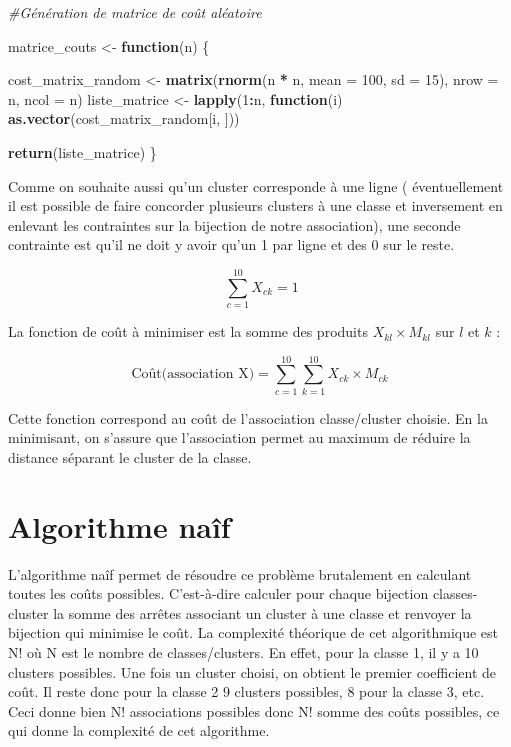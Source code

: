 \documentclass[
]{article}
\newenvironment{Shaded}{\begin{snugshade}}{\end{snugshade}}
\newcommand{\AttributeTok}[1]{\textcolor[rgb]{0.13,0.29,0.53}{#1}}
\newcommand{\CommentTok}[1]{\textcolor[rgb]{0.56,0.35,0.01}{\textit{#1}}}
\newcommand{\ControlFlowTok}[1]{\textcolor[rgb]{0.13,0.29,0.53}{\textbf{#1}}}
\newcommand{\DecValTok}[1]{\textcolor[rgb]{0.00,0.00,0.81}{#1}}
\newcommand{\FunctionTok}[1]{\textcolor[rgb]{0.13,0.29,0.53}{\textbf{#1}}}
\newcommand{\NormalTok}[1]{#1}
\newcommand{\OtherTok}[1]{\textcolor[rgb]{0.56,0.35,0.01}{#1}}
\newcommand{\SpecialCharTok}[1]{\textcolor[rgb]{0.81,0.36,0.00}{\textbf{#1}}}
\begin{document}
\begin{Shaded}
\begin{Highlighting}[]
\CommentTok{\#Génération de matrice de coût aléatoire}

\NormalTok{matrice\_couts }\OtherTok{\textless{}{-}} \ControlFlowTok{function}\NormalTok{(n) \{}
  
\NormalTok{  cost\_matrix\_random }\OtherTok{\textless{}{-}} \FunctionTok{matrix}\NormalTok{(}\FunctionTok{rnorm}\NormalTok{(n }\SpecialCharTok{*}\NormalTok{ n, }\AttributeTok{mean =} \DecValTok{100}\NormalTok{, }\AttributeTok{sd =} \DecValTok{15}\NormalTok{), }\AttributeTok{nrow =}\NormalTok{ n, }\AttributeTok{ncol =}\NormalTok{ n)}
\NormalTok{  liste\_matrice }\OtherTok{\textless{}{-}} \FunctionTok{lapply}\NormalTok{(}\DecValTok{1}\SpecialCharTok{:}\NormalTok{n, }\ControlFlowTok{function}\NormalTok{(i) }\FunctionTok{as.vector}\NormalTok{(cost\_matrix\_random[i, ]))}
  
  \FunctionTok{return}\NormalTok{(liste\_matrice)}
\NormalTok{\}}
\end{Highlighting}
\end{Shaded}

Comme on souhaite aussi qu'un cluster corresponde à une ligne (
éventuellement il est possible de faire concorder plusieurs clusters à
une classe et inversement en enlevant les contraintes sur la bijection
de notre association), une seconde contrainte est qu'il ne doit y avoir
qu'un 1 par ligne et des 0 sur le reste.

\[
\ \sum_{c=1}^{10} X_{ck} = 1
\]

La fonction de coût à minimiser est la somme des produits
\(X_{kl} \times M_{kl}\) sur \(l\) et \(k\) :

\[
\text{Coût(association X)} = \sum_{c=1}^{10} \sum_{k=1}^{10} X_{ck} \times M_{ck}
\]

Cette fonction correspond au coût de l'association classe/cluster
choisie. En la minimisant, on s'assure que l'association permet au
maximum de réduire la distance séparant le cluster de la classe.

\hypertarget{algorithme-nauxeef}{%
\section{Algorithme naîf}\label{algorithme-nauxeef}}

L'algorithme naîf permet de résoudre ce problème brutalement en
calculant toutes les coûts possibles. C'est-à-dire calculer pour chaque
bijection classes-cluster la somme des arrêtes associant un cluster à
une classe et renvoyer la bijection qui minimise le coût. La complexité
théorique de cet algorithmique est N! où N est le nombre de
classes/clusters. En effet, pour la classe 1, il y a 10 clusters
possibles. Une fois un cluster choisi, on obtient le premier coefficient
de coût. Il reste donc pour la classe 2 9 clusters possibles, 8 pour la
classe 3, etc. Ceci donne bien N! associations possibles donc N! somme
des coûts possibles, ce qui donne la complexité de cet algorithme.
\end{document}
